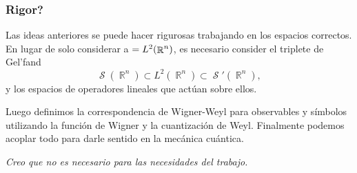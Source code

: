 \documentclass{beamer}
\DeclareMathOperator{\R}{\mathbb{R}}
\let\H\relax
\DeclareMathOperator{\H}{\mathcal H}
\DeclareMathOperator{\Sz}{\mathcal S}
\begin{document}
\begin{frame}
  \frametitle{Rigor?}

  Las ideas anteriores se puede hacer rigurosas trabajando
  en los espacios correctos. En lugar de solo considerar a
  $\H = L^2(\R^{n})$, es necesario consider el triplete de
  Gel'fand
  \begin{equation}
    \Sz(\R^{n}) \subset L^2(\R^{n}) \subset \Sz'(\R^{n}),
  \end{equation}
  y los espacios de operadores lineales que actúan sobre
  ellos.

  \hspace{2mm} Luego definimos la correspondencia de
  Wigner-Weyl para observables y símbolos utilizando la
  función de Wigner y la cuantización de Weyl. Finalmente
  podemos acoplar todo para darle sentido en la mecánica
  cuántica.

  \vspace{2mm}

  \textit{Creo que no es necesario para las necesidades del
  trabajo.}
\end{frame}
\end{document}
